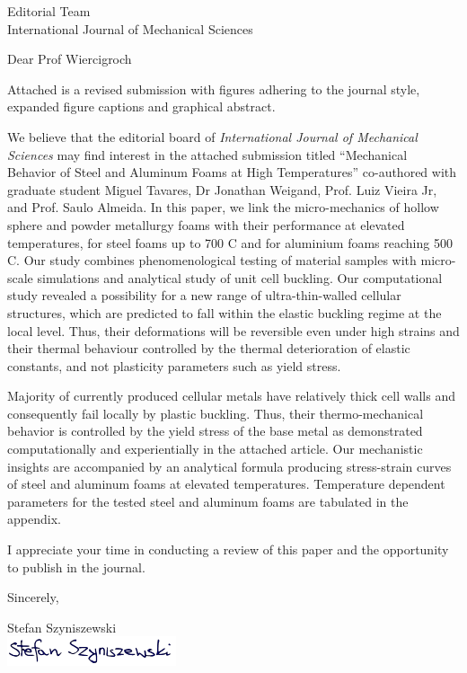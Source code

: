 \documentclass[11pt]{durhamLetter}
\newcommand{\JournalName}{International Journal of Mechanical Sciences}
\begin{document}
\begin{letter}{
		Editorial Team \\
		\JournalName
               }

\opening{Dear Prof Wiercigroch}

Attached is a revised submission with figures adhering to the journal style, expanded figure captions and graphical abstract. 

We believe that the editorial board of {\em \JournalName} may find interest in the attached submission titled “Mechanical Behavior of Steel and Aluminum Foams at High Temperatures” co-authored with graduate student Miguel Tavares, Dr Jonathan Weigand, Prof. Luiz Vieira Jr, and Prof. Saulo Almeida. In this paper, we link the micro-mechanics of hollow sphere and powder metallurgy foams with their performance at elevated temperatures, for steel foams up to 700 C and for aluminium foams reaching 500 C. Our study combines phenomenological testing of material samples with micro-scale simulations and analytical study of unit cell buckling. Our computational study revealed a possibility for a new range of ultra-thin-walled cellular structures, which are predicted to fall within the elastic buckling regime at the local level. Thus, their deformations will be reversible even under high strains and their thermal behaviour controlled by the thermal deterioration of elastic constants, and not plasticity parameters such as yield stress. 

Majority of currently produced cellular metals have relatively thick cell walls and consequently fail locally by plastic buckling. Thus, their thermo-mechanical behavior is controlled by the yield stress of the base metal as demonstrated computationally and experientially in the attached article. Our mechanistic insights are accompanied by an analytical formula producing stress-strain curves of steel and aluminum foams at elevated temperatures. Temperature dependent parameters for the tested steel and aluminum foams are tabulated in the appendix.

I appreciate your time in conducting a review of this paper and the opportunity to publish in the journal.

Sincerely,

\vspace{1\parskip}%

\closing{ Stefan Szyniszewski \\
	\includegraphics[width=0.8\linewidth]{Signature.png}
}




\end{letter}
\end{document}
